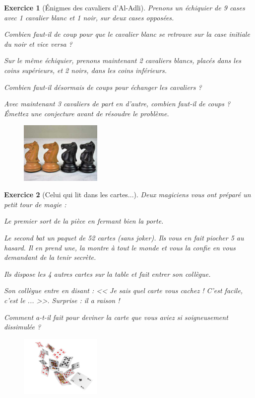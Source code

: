\documentclass[12pt]{article}
\theoremstyle{break}
\newtheorem{exo}{Exercice}
\begin{document}
\begin{exo}[Énigmes des cavaliers d'Al-Adli]
Prenons un échiquier de 9 cases avec 1 cavalier blanc et 1 noir, sur deux cases opposées.

Combien faut-il de coup pour que le cavalier blanc se retrouve sur la case initiale du noir et vice versa ?

Sur le même échiquier, prenons maintenant 2 cavaliers blancs, placés dans les coins supérieurs, et 2 noirs, dans les coins inférieurs.

Combien faut-il désormais de coups pour échanger les cavaliers ?

Avec maintenant 3 cavaliers de part en d'autre, combien faut-il de coups ? \textit{Émettez une conjecture avant de résoudre le problème.}


\begin{figure}[h!]
	\centering
	\includegraphics[width=0.35\textwidth]{4Cavaliers.jpg}
\end{figure}
\end{exo}


\begin{exo}[Celui qui lit dans les cartes...]
Deux magiciens vous ont préparé un petit tour de magie :

Le premier sort de la pièce en fermant bien la porte.

Le second bat un paquet de 52 cartes (sans joker). Ils vous en fait piocher 5 au hasard. Il en prend une, la montre à tout le monde et vous la confie en vous demandant de la tenir secrète.

Ils dispose les 4 autres cartes sur la table et fait entrer son collègue.

Son collègue entre en disant : << Je sais quel carte vous cachez ! C'est facile, c'est le ... >>. Surprise : il a raison !

Comment a-t-il fait pour deviner la carte que vous aviez si soigneusement dissimulée ?


\begin{figure}[h!]
	\centering
	\includegraphics[width=0.35\textwidth]{Cartes.jpeg}
\end{figure}
\end{exo}
\end{document}
